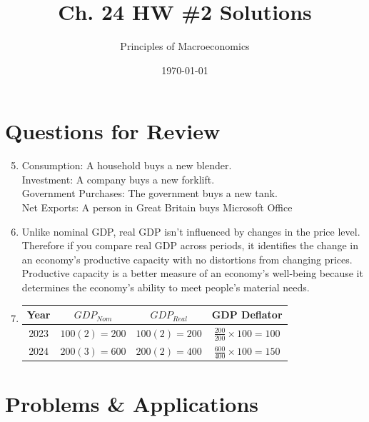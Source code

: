 \documentclass{article}
\title{Ch. 24 HW \#2 Solutions}
\author{Principles of Macroeconomics}
\date{\today}
\begin{document}
\maketitle

\section*{Questions for Review}

\begin{enumerate}

\setcounter{enumi}{4}
\item Consumption: A household buys a new blender. \\
	Investment: A company buys a new forklift. \\
	Government Purchases: The government buys a new tank. \\
	Net Exports: A person in Great Britain buys Microsoft Office
	
\item Unlike nominal GDP, real GDP isn't influenced by changes in the price level. Therefore if you compare real GDP across periods, it identifies the change in an economy's productive capacity with no distortions from changing prices. Productive capacity is a better measure of an economy's well-being because it determines the economy's ability to meet people's material needs.

\item \phantom{x}
	
	\begin{center}
	\begin{tabular}{| c | c | c | c |}
	\hline
	Year & $GDP_{Nom}$ & $GDP_{Real}$ & GDP Deflator \\
	\hline
	2023 & $100(2) = 200$ & $100(2) = 200$ & $\frac{200}{200} \times 100 = 100$ \\
	\hline
	2024 & $200(3) = 600$ & $200(2) = 400$ & $\frac{600}{400} \times 100 = 150$ \\
	\hline
	\end{tabular}
	\end{center}

\end{enumerate}

\section*{Problems \& Applications}
\end{document}
